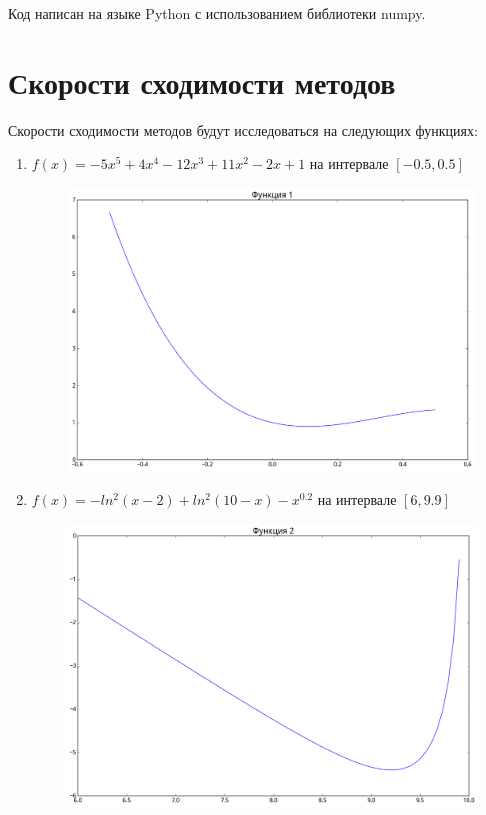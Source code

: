 \documentclass[12pt, a4paper]{article}
\begin{document}
        Код написан на языке Python с использованием библиотеки numpy.

    \section{Скорости сходимости методов}
        Скорости сходимости методов будут исследоваться на следующих функциях:
        \def \picwidth {14cm}
        \def \picheight {7.5cm}
        \begin{enumerate}
            \item $f(x) = -5 x^5 + 4 x^4 - 12 x^3 + 11 x^2 - 2 x + 1$ на интервале $[-0.5, 0.5]$
                \begin{center}\includegraphics[width=\picwidth, height=\picheight]{fun1.png}\end{center}

            \item $f(x) = -ln^2(x - 2) + ln^2(10 - x) - x^{0.2}$ на интервале $[6, 9.9]$
                \begin{center}\includegraphics[width=\picwidth, height=\picheight]{fun2.png}\end{center}


\end{enumerate}
\end{document}
